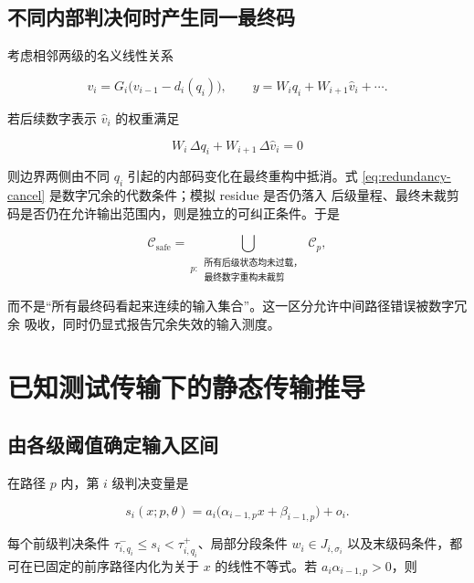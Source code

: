 \documentclass[11pt,a4paper]{ctexart}
\theoremstyle{adcplain}
\theoremstyle{definition}
\begin{document}
\subsection{不同内部判决何时产生同一最终码}

考虑相邻两级的名义线性关系

\begin{equation}
  v_i=G_i\bigl(v_{i-1}-d_i(q_i)\bigr),
  \qquad
  y=W_i q_i+W_{i+1}\widehat v_i+\cdots .
\end{equation}

若后续数字表示 $\widehat v_i$ 的权重满足

\begin{equation}
  W_i\,\Delta q_i
  +
  W_{i+1}\,\Delta \widehat v_i
  =0
  \label{eq:redundancy-cancel}
\end{equation}

则边界两侧由不同 $q_i$ 引起的内部码变化在最终重构中抵消。式
\eqref{eq:redundancy-cancel} 是数字冗余的代数条件；模拟 residue 是否仍落入
后级量程、最终未裁剪码是否仍在允许输出范围内，则是独立的可纠正条件。于是

\begin{equation}
  \mathcal C_{\mathrm{safe}}
  =
  \bigcup_{p:\,\substack{\text{所有后级状态均未过载，}\\
                         \text{最终数字重构未裁剪}}}
  \mathcal C_p,
  \label{eq:safe-domain}
\end{equation}

而不是“所有最终码看起来连续的输入集合”。这一区分允许中间路径错误被数字冗余
吸收，同时仍显式报告冗余失效的输入测度。

\section{已知测试传输下的静态传输推导}

\subsection{由各级阈值确定输入区间}

在路径 $p$ 内，第 $i$ 级判决变量是

\begin{equation}
  s_i(x;p,\theta)
  =
  a_i\bigl(\alpha_{i-1,p}x+\beta_{i-1,p}\bigr)+o_i.
\end{equation}

每个前级判决条件
$\tau^-_{i,q_i}\le s_i<\tau^+_{i,q_i}$、局部分段条件
$w_i\in J_{i,\sigma_i}$ 以及末级码条件，都可在已固定的前序路径内化为关于
$x$ 的线性不等式。若
$a_i\alpha_{i-1,p}>0$，则
\end{document}
